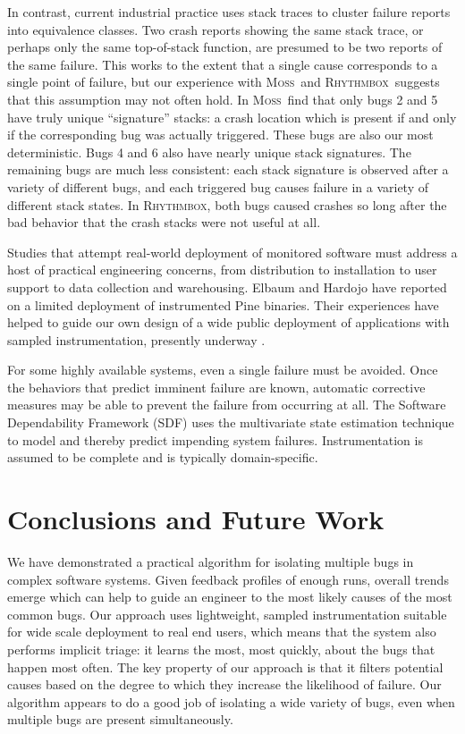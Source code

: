\documentclass[draft]{sig-alternate}
\newcommand{\moss}{\textsc{Moss}\xspace}
\newcommand{\rhythmbox}{\textsc{Rhythmbox}\xspace}
\begin{document}
In contrast, current
industrial practice uses stack traces to cluster failure reports into
equivalence classes.  Two crash reports showing the same stack trace,
or perhaps only the same top-of-stack function, are presumed to be two
reports of the same failure.  This works to the extent that a single
cause corresponds to a single point of failure, but our experience
with \moss\ and \rhythmbox\ suggests that this assumption may not often hold.  In \moss\ find
that only bugs 2 and 5 have truly unique ``signature'' stacks: a
crash location which is present if and only if the corresponding bug
was actually triggered.  These bugs are also our most deterministic.
Bugs 4 and 6 also have nearly unique stack signatures.
The remaining bugs are much less consistent: each stack signature is
observed after a variety of different bugs, and each triggered bug
causes failure in a variety of different stack states.  In \rhythmbox,
both bugs caused crashes so long after the bad behavior that the crash stacks
were not useful at all.

Studies that attempt real-world deployment of monitored software must
address a host of practical engineering concerns, from distribution to
installation to user support to data collection and warehousing.
Elbaum and Hardojo \cite{Elbaum:2003:DISATA} have reported on a
limited deployment of instrumented Pine binaries.  Their experiences
have helped to guide our own design of a wide public deployment of
applications with sampled instrumentation, presently underway
\cite{Liblit:2003:CBIP}.

For some highly available systems, even a single failure must be
avoided.  Once the behaviors that predict imminent failure are known,
automatic corrective measures may be able to prevent the failure from
occurring at all.  The Software Dependability Framework (SDF)
\cite{Gross:2003:PSMUST} uses the multivariate state estimation
technique to model and thereby predict impending system failures.
Instrumentation is assumed to be complete and is typically
domain-specific.

\section{Conclusions and Future Work}
\label{sec:conclusions}

We have demonstrated a practical algorithm for isolating multiple bugs
in complex software systems.  Given feedback profiles of enough runs,
overall trends emerge which can help to guide an engineer to the most
likely causes of the most common bugs.  Our approach uses lightweight,
sampled instrumentation suitable for wide scale deployment to real end
users, which means that the system also performs implicit triage: it
learns the most, most quickly, about the bugs that happen most often.
The key property of our approach is that it filters potential causes
based on the degree to which they increase the likelihood of failure.
Our algorithm appears to do a good job of isolating a wide variety of
bugs, even when multiple bugs are present simultaneously.
\end{document}
